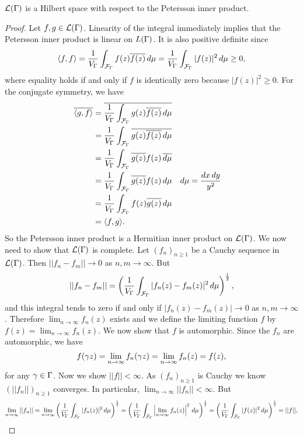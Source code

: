       \begin{theorem}
        $\mathcal{L}(\Gamma)$ is a Hilbert space with respect to the Petersson inner product.
      \end{theorem}
      \begin{proof}
        Let $f,g \in \mathcal{L}(\Gamma)$. Linearity of the integral immediately implies that the Petersson inner product is linear on $\mathcal{\mathcal}{L}(\Gamma)$. It is also positive definite since
        \[
          \langle f,f\rangle = \frac{1}{V_{\Gamma}}\int_{\mathcal{F}_{\Gamma}}f(z)\overline{f(z)}\,d\mu = \frac{1}{V_{\Gamma}}\int_{\mathcal{F}_{\Gamma}}|f(z)|^{2}\,d\mu \ge 0,
        \]
        where equality holds if and only if $f$ is identically zero because $|f(z)|^{2}\ge 0$. For the conjugate symmetry, we have
        \begin{align*}
          \overline{\langle g,f\rangle} &= \overline{\frac{1}{V_{\Gamma}}\int_{\mathcal{F}_{\Gamma}}g(z)\overline{f(z)}\,d\mu} \\
          &= \frac{1}{V_{\Gamma}}\int_{\mathcal{F}_{\Gamma}}\overline{g(z)\overline{f(z)}\,d\mu} \\
          &= \frac{1}{V_{\Gamma}}\int_{\mathcal{F}_{\Gamma}}\overline{g(z)}f(z)\,\overline{d\mu} \\
          &= \frac{1}{V_{\Gamma}}\int_{\mathcal{F}_{\Gamma}}\overline{g(z)}f(z)\,d\mu && \text{$d\mu = \frac{dx\,dy}{y^{2}}$} \\
          &= \frac{1}{V_{\Gamma}}\int_{\mathcal{F}_{\Gamma}}f(z)\overline{g(z)}\,d\mu \\
          &= \langle f,g\rangle.
        \end{align*}
        So the Petersson inner product is a Hermitian inner product on $\mathcal{L}(\Gamma)$. We now need to show that $\mathcal{L}(\Gamma)$ is complete. Let $(f_{n})_{n \ge 1}$ be a Cauchy sequence in $\mathcal{L}(\Gamma)$. Then $||f_{n}-f_{m}|| \to 0$ as $n,m \to \infty$. But
        \[
          ||f_{n}-f_{m}|| = \left(\frac{1}{V_{\Gamma}}\int_{\mathcal{F}_{\Gamma}}|f_{n}(z)-f_{m}(z)|^{2}\,d\mu\right)^{\frac{1}{2}},
        \]
        and this integral tends to zero if and only if $|f_{n}(z)-f_{m}(z)| \to 0$ as $n,m \to \infty$. Therefore $\lim_{n \to \infty}f_{n}(z)$ exists and we define the limiting function $f$ by $f(z) = \lim_{n \to \infty}f_{n}(z)$. We now show that $f$ is automorphic. Since the $f_{n}$ are automorphic, we have
        \[
          f(\gamma z) = \lim_{n \to \infty}f_{n}(\gamma z) = \lim_{n \to \infty}f_{n}(z) = f(z),
        \]
        for any $\gamma \in \Gamma$. Now we show $||f|| < \infty$. As $(f_{n})_{n \ge 1}$ is Cauchy we know $(||f_{n}||)_{n \ge 1}$ converges. In particular, $\lim_{n \to \infty}||f_{n}|| < \infty$. But
        \[
          \lim_{n \to \infty}||f_{n}|| = \lim_{n \to \infty}\left(\frac{1}{V_{\Gamma}}\int_{\mathcal{F}_{\Gamma}}|f_{n}(z)|^{2}\,d\mu\right)^{\frac{1}{2}} = \left(\frac{1}{V_{\Gamma}}\int_{\mathcal{F}_{\Gamma}}\left|\lim_{n \to \infty}f_{n}(z)\right|^{2}\,d\mu\right)^{\frac{1}{2}} = \left(\frac{1}{V_{\Gamma}}\int_{\mathcal{F}_{\Gamma}}|f(z)|^{2}\,d\mu\right)^{\frac{1}{2}} = ||f||,
\]
\end{proof}
